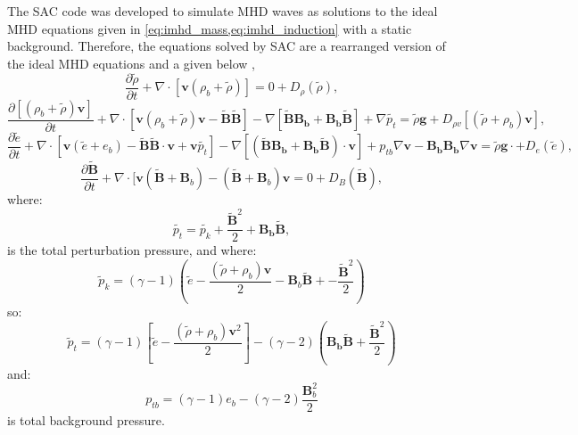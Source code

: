 The SAC code was developed to simulate MHD waves as solutions to the ideal MHD equations given in \cref{eq:imhd_mass,eq:imhd_induction} with a static background.
Therefore, the equations solved by SAC are a rearranged version of the ideal MHD equations and a given below \citep[taken from][]{shelyag2008},
\begin{equation}
\frac{\partial\tilde{\rho}}{\partial t}+\nabla\cdot[\mathbf{v}(\rho_{b}+\tilde{\rho})]=0+D_{\rho}(\tilde{\rho}),
\end{equation}
\begin{equation}
\frac{\partial[(\rho_{b}+\tilde{\rho})\mathbf{v}]}{\partial t}+\nabla\cdot[\mathbf{v}(\rho_{b}+\tilde{\rho})\mathbf{v}-\mathbf{\tilde{B}\tilde{B}}]-\nabla[\mathbf{\tilde{B}}\mathbf{B_{b}}+\mathbf{B_{b}}\mathbf{\tilde{B}}]+\nabla\tilde{p_{t}}=\tilde{\rho}\mathbf{g}+D_{\rho v}[(\tilde{\rho}+\rho_{b})\mathbf{v}],
\end{equation}
\begin{equation}
\frac{\partial\tilde{e}}{\partial t}+\nabla\cdot[\mathbf{v}(\tilde{e}+e_{b})-\mathbf{\tilde{B}\tilde{B}}\cdot\mathbf{v}+\mathbf{v}\tilde{p_{t}}]-\nabla[(\mathbf{\tilde{B}B_{b}}+\mathbf{B_{b}\tilde{B}})\cdot\mathbf{v}]+p_{tb}\nabla\mathbf{v}-\mathbf{B_{b}}\mathbf{B_{b}}\nabla\mathbf{v}=\tilde{\rho}\mathbf{g}\cdot+D_{e}(\tilde{e}),
\end{equation}
\begin{equation}
\frac{\partial\mathbf{\tilde{B}}}{\partial t}+\nabla\cdot[\mathbf{v}(\mathbf{\tilde{B}}+\mathbf{B}_{b})-(\mathbf{\tilde{B}}+\mathbf{B}_{b})\mathbf{v}=0+D_{B}(\mathbf{\tilde{B}}),
\end{equation}
where:
\begin{equation}
\tilde{p_{t}}=\tilde{p_{k}}+\frac{\tilde{\mathbf{B}}^{2}}{2}+\mathbf{B_{b}\tilde{B}},
\end{equation}
is the total perturbation pressure, and where: 
\begin{equation}
\tilde{p}_{k}=(\gamma-1)\left(\tilde{e}-\frac{(\tilde{\rho}+\rho_{b})\mathbf{v}}{2}-\mathbf{B}_b\mathbf{\tilde{B}}+-\frac{\tilde{\mathbf{B}}^{2}}{2}\right)
\end{equation}
so:
\begin{equation}
\tilde{p}_{t}=(\gamma-1)\left[\tilde{e}-\frac{(\tilde{\rho}+\rho_{b})\mathbf{v}^{2}}{2}\right]-(\gamma-2)\left(\mathbf{B_{b}\tilde{B}}+\frac{\tilde{\mathbf{B}}^{2}}{2}\right)
\end{equation}
and:
\begin{equation}
p_{tb}=(\gamma-1)e_{b}-(\gamma-2)\frac{\mathbf{B}_{b}^{2}}{2}
\end{equation}
is total background pressure.

